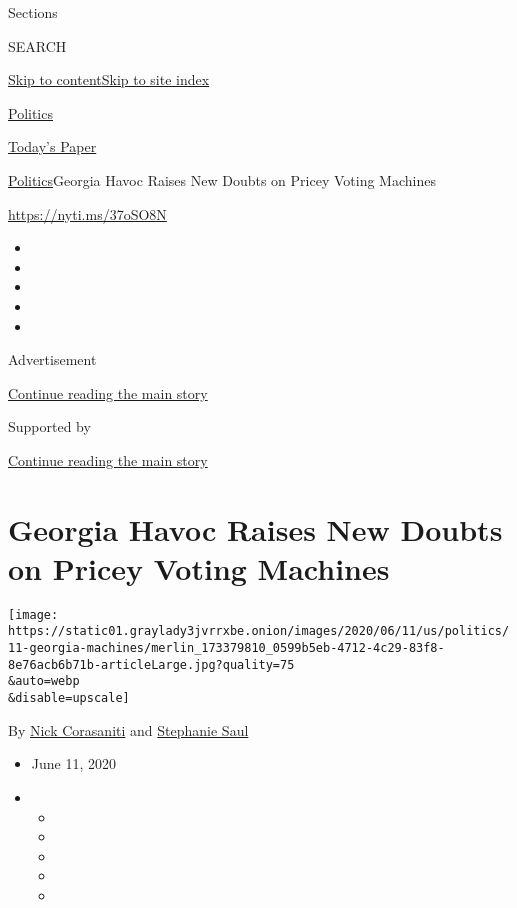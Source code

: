 Sections

SEARCH

\protect\hyperlink{site-content}{Skip to
content}\protect\hyperlink{site-index}{Skip to site index}

\href{https://www.nytimes3xbfgragh.onion/section/politics}{Politics}

\href{https://myaccount.nytimes3xbfgragh.onion/auth/login?response_type=cookie\&client_id=vi}{}

\href{https://www.nytimes3xbfgragh.onion/section/todayspaper}{Today's
Paper}

\href{/section/politics}{Politics}\textbar{}Georgia Havoc Raises New
Doubts on Pricey Voting Machines

\url{https://nyti.ms/37oSO8N}

\begin{itemize}
\item
\item
\item
\item
\item
\end{itemize}

Advertisement

\protect\hyperlink{after-top}{Continue reading the main story}

Supported by

\protect\hyperlink{after-sponsor}{Continue reading the main story}

\hypertarget{georgia-havoc-raises-new-doubts-on-pricey-voting-machines}{%
\section{Georgia Havoc Raises New Doubts on Pricey Voting
Machines}\label{georgia-havoc-raises-new-doubts-on-pricey-voting-machines}}

\texttt{[image: https://static01.graylady3jvrrxbe.onion/images/2020/06/11/us/politics/11-georgia-machines/merlin\_173379810\_0599b5eb-4712-4c29-83f8-8e76acb6b71b-articleLarge.jpg?quality=75\\\&auto=webp\\\&disable=upscale]}

By \href{https://www.nytimes3xbfgragh.onion/by/nick-corasaniti}{Nick
Corasaniti} and
\href{https://www.nytimes3xbfgragh.onion/by/stephanie-saul}{Stephanie
Saul}

\begin{itemize}
\item
  June 11, 2020
\item
  \begin{itemize}
  \item
  \item
  \item
  \item
  \item
  \end{itemize}
\end{itemize}


